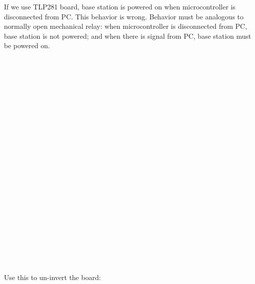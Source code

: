 \nopagenumbers
If we use TLP281 board, base station is powered on when microcontroller is disconnected from PC.
This behavior is wrong. Behavior must be analogous to normally open mechanical relay: when
microcontroller is disconnected from PC, base station is not powered; and when
there is signal from PC, base station must be powered on.
$$\hbox to16cm{\vbox to5.82cm{\vfil\special{psfile=tlp2.eps
  clip llx=0 lly=0 urx=863 ury=314 rwi=4535}}\hfil}$$
$$\hbox to15.38cm{\vbox to7.26722222222222cm{\vfil\special{psfile=tlp1.eps
  clip llx=0 lly=0 urx=436 ury=206 rwi=4360}}\hfil}$$
Use this to un-invert the board:
$$\hbox to7.26cm{\vbox to6.24416666666667cm{\vfil\special{psfile=tlp.1
  clip llx=-1 lly=-33 urx=205 ury=144 rwi=2060}}\hfil}$$
\bye
